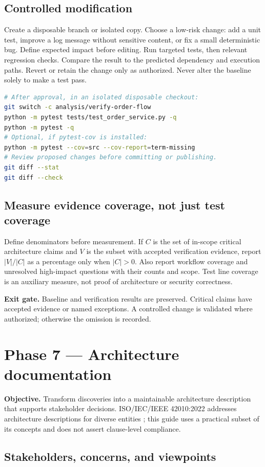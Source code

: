 \documentclass[11pt,letterpaper]{article}
\newcommand{\gate}[1]{\par\noindent\colorbox{pale}{\parbox{\dimexpr\linewidth-2\fboxsep\relax}{\textbf{\color{teal}Exit gate.} #1}}\par}
\begin{document}
\subsection{Controlled modification}
Create a disposable branch or isolated copy. Choose a low-risk change: add a unit test, improve a log message without sensitive content, or fix a small deterministic bug. Define expected impact before editing. Run targeted tests, then relevant regression checks. Compare the result to the predicted dependency and execution paths. Revert or retain the change only as authorized. Never alter the baseline solely to make a test pass.
\begin{lstlisting}[language=bash]
# After approval, in an isolated disposable checkout:
git switch -c analysis/verify-order-flow
python -m pytest tests/test_order_service.py -q
python -m pytest -q
# Optional, if pytest-cov is installed:
python -m pytest --cov=src --cov-report=term-missing
# Review proposed changes before committing or publishing.
git diff --stat
git diff --check
\end{lstlisting}
\subsection{Measure evidence coverage, not just test coverage}
Define denominators before measurement. If $C$ is the set of in-scope critical architecture claims and $V$ is the subset with accepted verification evidence, report $|V|/|C|$ as a percentage only when $|C|>0$. Also report workflow coverage and unresolved high-impact questions with their counts and scope. Test line coverage is an auxiliary measure, not proof of architecture or security correctness.
\gate{Baseline and verification results are preserved. Critical claims have accepted evidence or named exceptions. A controlled change is validated where authorized; otherwise the omission is recorded.}
\clearpage
\section{Phase 7 --- Architecture documentation}
\textbf{Objective.} Transform discoveries into a maintainable architecture description that supports stakeholder decisions. ISO/IEC/IEEE 42010:2022 addresses architecture descriptions for diverse entities \cite{iso}; this guide uses a practical subset of its concepts and does not assert clause-level compliance.
\subsection{Stakeholders, concerns, and viewpoints}
\end{document}
